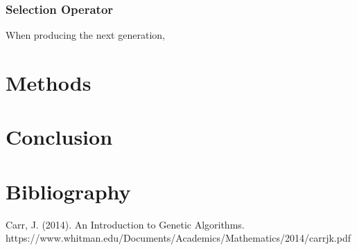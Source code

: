 \documentclass{article}
\begin{document}
\bigbreak
\subsubsection{Selection Operator}
When producing the next generation, 

\bigbreak
\section{Methods}

\newpage
\section{Conclusion}

\newpage
\section{Bibliography}
Carr, J. (2014). An Introduction to Genetic Algorithms.\smallbreak
https://www.whitman.edu/Documents/Academics/Mathematics/2014/carrjk.pdf
\end{document}
